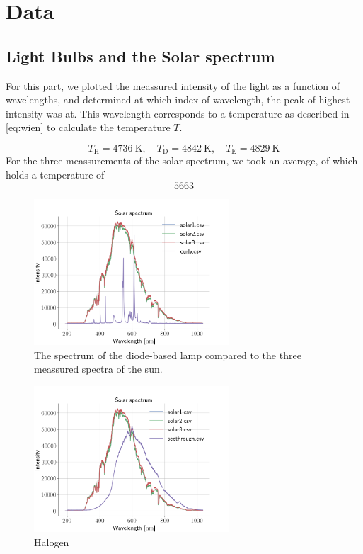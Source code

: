 \section{Data}

\subsection{Light Bulbs and the Solar spectrum}
For this part, we plotted the meassured intensity of the light as a function of 
wavelengths, and determined at which index of wavelength, the peak of highest
intensity was at. This wavelength corresponds to a temperature as described in
\cref{eq:wien} to calculate the temperature $T$.

\begin{equation}
    T_{\text{H}} = \SI{4736}{\kelvin}, \quad T_{\text{D}} =
    \SI{4842}{\kelvin}, \quad T_{\text{E}} = \SI{4829}{\kelvin}
\end{equation}
For the three meassurements of the solar spectrum, we took an average, of which
holds a temperature of
\begin{equation}
5663
\end{equation}

\begin{figure}[h!]
\centering
\includegraphics[width=0.65\textwidth]{SolarComparison0}
\caption{The spectrum of the diode-based lamp compared to the three meassured spectra of
the sun.} 
\label{diode}
\end{figure}

\begin{figure}[h!]
\centering
\includegraphics[width=0.65\textwidth]{SolarComparison1}
\caption{Halogen}
\label{halogen}
\end{figure}


